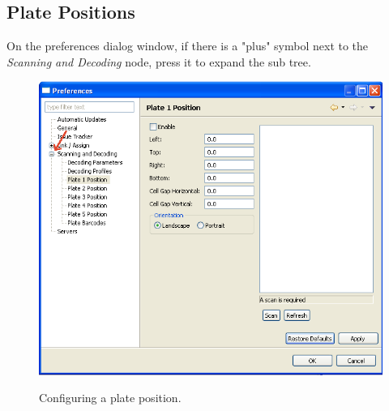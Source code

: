\subsection{Plate Positions}
On the preferences dialog window, if there is a "plus" symbol next to the
\emph{Scanning and Decoding} node, press it to expand the sub tree.
    \begin{figure}[H]
      \centering
      \scalebox{0.5}
      { \includegraphics*{screenshots/configuration/plate1_definition} }
      \caption{Configuring a plate position.}
      \label{fig:plate1_definition}
    \end{figure}

